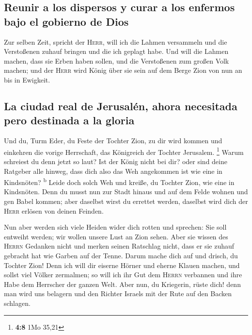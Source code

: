 \hypertarget{reunir-a-los-dispersos-y-curar-a-los-enfermos-bajo-el-gobierno-de-dios}{%
\subsection{Reunir a los dispersos y curar a los enfermos bajo el
gobierno de
Dios}\label{reunir-a-los-dispersos-y-curar-a-los-enfermos-bajo-el-gobierno-de-dios}}

 Zur selben Zeit, spricht der \textsc{Herr}, will ich die
Lahmen versammeln und die Verstoßenen zuhauf bringen und die ich geplagt
habe.  Und will die Lahmen machen, dass sie Erben haben
sollen, und die Verstoßenen zum großen Volk machen; und der
\textsc{Herr} wird König über sie sein auf dem Berge Zion von nun an bis
in Ewigkeit.

\hypertarget{la-ciudad-real-de-jerusaluxe9n-ahora-necesitada-pero-destinada-a-la-gloria}{%
\subsection{La ciudad real de Jerusalén, ahora necesitada pero destinada
a la
gloria}\label{la-ciudad-real-de-jerusaluxe9n-ahora-necesitada-pero-destinada-a-la-gloria}}

 Und du, Turm Eder, du Feste der Tochter Zion, zu dir wird
kommen und einkehren die vorige Herrschaft, das Königreich der Tochter
Jerusalem. \footnote{\textbf{4:8} 1Mo 35,21}  Warum
schreiest du denn jetzt so laut? Ist der König nicht bei dir? oder sind
deine Ratgeber alle hinweg, dass dich also das Weh angekommen ist wie
eine in Kindsnöten? \textsuperscript{b}  Leide doch solch
Weh und kreiße, du Tochter Zion, wie eine in Kindsnöten. Denn du musst
nun zur Stadt hinaus und auf dem Felde wohnen und gen Babel kommen; aber
daselbst wirst du errettet werden, daselbst wird dich der \textsc{Herr}
erlösen von deinen Feinden.

 Nun aber werden sich viele Heiden wider dich rotten und
sprechen: Sie soll entweiht werden; wir wollen unsere Lust an Zion
sehen.  Aber sie wissen des \textsc{Herrn} Gedanken nicht
und merken seinen Ratschlag nicht, dass er sie zuhauf gebracht hat wie
Garben auf der Tenne.  Darum mache dich auf und drisch,
du Tochter Zion! Denn ich will dir eiserne Hörner und eherne Klauen
machen, und sollst viel Völker zermalmen; so will ich ihr Gut dem
\textsc{Herrn} verbannen und ihre Habe dem Herrscher der ganzen Welt.
 Aber nun, du Kriegerin, rüste dich! denn man wird uns
belagern und den Richter Israels mit der Rute auf den Backen schlagen.

